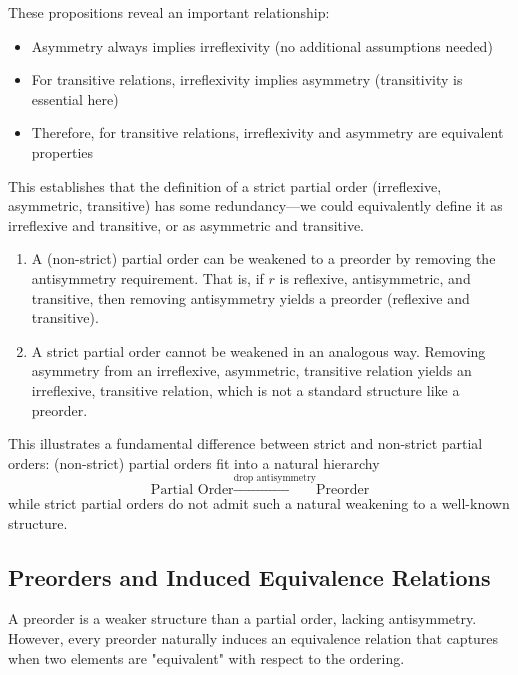 \begin{remark}
These propositions reveal an important relationship:
\begin{itemize}
    \item Asymmetry always implies irreflexivity (no additional assumptions needed)
    \item For transitive relations, irreflexivity implies asymmetry (transitivity is essential here)
    \item Therefore, for transitive relations, irreflexivity and asymmetry are equivalent properties
\end{itemize}

This establishes that the definition of a strict partial order (irreflexive, asymmetric, transitive) has some redundancy—we could equivalently define it as irreflexive and transitive, or as asymmetric and transitive.
\end{remark}

\begin{remark}

\begin{enumerate}
    \item A (non-strict) partial order can be weakened to a preorder by removing the antisymmetry requirement. That is, if $r$ is reflexive, antisymmetric, and transitive, then removing antisymmetry yields a preorder (reflexive and transitive).
    
    \item A strict partial order cannot be weakened in an analogous way. Removing asymmetry from an irreflexive, asymmetric, transitive relation yields an irreflexive, transitive relation, which is not a standard structure like a preorder.
\end{enumerate}

This illustrates a fundamental difference between strict and non-strict partial orders: (non-strict) partial orders fit into a natural hierarchy
\[
\text{Partial Order} \xrightarrow{\text{drop antisymmetry}} \text{Preorder}
\]
while strict partial orders do not admit such a natural weakening to a well-known structure.
\end{remark}

\subsection{Preorders and Induced Equivalence Relations}

A preorder is a weaker structure than a partial order, lacking antisymmetry. However, every preorder naturally induces an equivalence relation that captures when two elements are "equivalent" with respect to the ordering.

